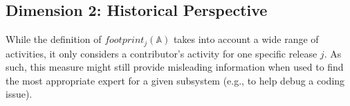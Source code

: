 



\subsection{Dimension 2: Historical Perspective}
\label{sec:historical-percpective}


While the definition of $footprint_j(\mathbb{A})$ takes into account a wide range of activities, it only considers a contributor's activity for one specific release $j$. As such, this measure might still provide misleading information when used to find the most appropriate expert for a given subsystem (e.g., to help debug a coding issue).

